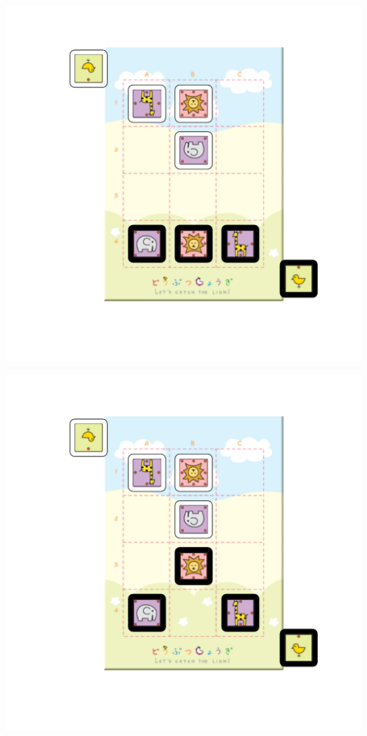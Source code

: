 \documentclass{beamer}
\begin{document}
\begin{frame}
\includegraphics[scale = 0.6, clip=true, trim=1in 1in 0in 0.5in]{example2.pdf}
\end{frame}
\begin{frame}
\includegraphics[scale = 0.6, clip=true, trim=1in 1in 0in 0.5in]{example3.pdf}
\end{frame}
\end{document}
